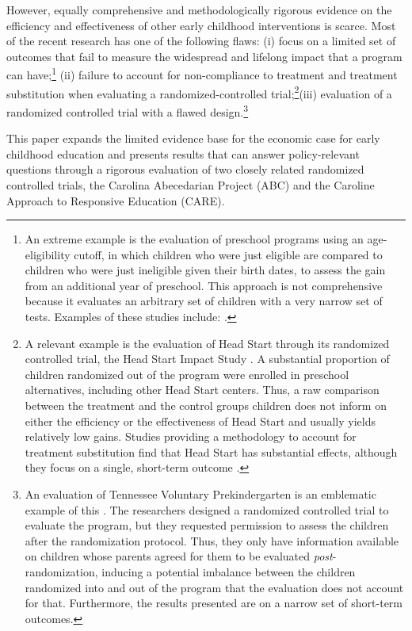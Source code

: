 However, equally comprehensive and methodologically rigorous evidence on the efficiency and effectiveness of other early childhood interventions is scarce. Most of the recent research has one of the following flaws: (i) focus on a limited set of outcomes that fail to measure the widespread and lifelong impact that a program can have;\footnote{An extreme example is the evaluation of preschool programs using an age-eligibility cutoff, in which children who were just eligible are compared to children who were just ineligible given their birth dates, to assess the gain from an additional year of preschool. This approach is not comprehensive because it evaluates an arbitrary set of children with a very narrow set of tests. Examples of these studies include: \citep{Gormley_Gayer_2005_JHR,Gormley_Gayer_etal_2005_DP,Weiland_2013_CD_Impacts-of-Pre-K}.} (ii) failure to account for non-compliance to treatment and treatment substitution when evaluating a randomized-controlled trial;\footnote{A relevant example is the evaluation of Head Start through its randomized controlled trial, the Head Start Impact Study \citep{Puma_Bell_etal_2010_HeadStartImpact}. A substantial proportion of children randomized out of the program were enrolled in preschool alternatives, including other Head Start centers. Thus, a raw comparison between the treatment and the control groups children does not inform on either the efficiency or the effectiveness of Head Start and usually yields relatively low gains. Studies providing a methodology to account for treatment substitution find that Head Start has substantial effects, although they focus on a single, short-term outcome \citep{Kline-Walters_2015_NBER-Evaluating,Feller_Grindal_etal_2016_ComparedtoWhat}.}(iii) evaluation of a randomized controlled trial with a flawed design.\footnote{An evaluation of Tennessee Voluntary Prekindergarten is an emblematic example of this \citep{Lipsey_et_al_2013_Tennessee_Kindergrtn_PRI,Lipsey_et_al_2015_Randomized_Control_Trial_PRI}. The researchers designed a randomized controlled trial to evaluate the program, but they requested permission to assess the children after the randomization protocol. Thus, they only have information available on children whose parents agreed for them to be evaluated \textit{post}-randomization, inducing a potential imbalance between the children randomized into and out of the program that the evaluation does not account for that. Furthermore, the results presented are on a narrow set of short-term outcomes.} 

This paper expands the limited evidence base for the economic case for early childhood education and presents results that can answer policy-relevant questions through a rigorous evaluation of two closely related randomized controlled trials, the Carolina Abecedarian Project (ABC) and the Caroline Approach to Responsive Education (CARE).

